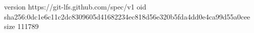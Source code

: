 version https://git-lfs.github.com/spec/v1
oid sha256:0dc1e6c11c2dc8309605d41682234ec818d56e320b5fda4dd0e4ca99d55a0cee
size 111789
